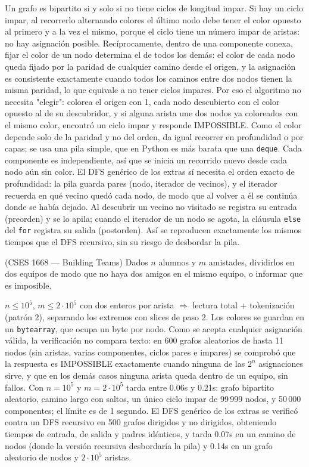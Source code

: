  Un grafo es bipartito si y solo si no tiene ciclos de longitud impar. Si hay un ciclo impar, al recorrerlo alternando colores el último nodo debe tener el color opuesto al primero y a la vez el mismo, porque el ciclo tiene un número impar de aristas: no hay asignación posible. Recíprocamente, dentro de una componente conexa, fijar el color de un nodo determina el de todos los demás: el color de cada nodo queda fijado por la paridad de cualquier camino desde el origen, y la asignación es consistente exactamente cuando todos los caminos entre dos nodos tienen la misma paridad, lo que equivale a no tener ciclos impares. Por eso el algoritmo no necesita "elegir": colorea el origen con 1, cada nodo descubierto con el color opuesto al de su descubridor, y si alguna arista une dos nodos ya coloreados con el mismo color, encontró un ciclo impar y responde IMPOSSIBLE. Como el color depende solo de la paridad y no del orden, da igual recorrer en profundidad o por capas; se usa una pila simple, que en Python es más barata que una \texttt{deque}. Cada componente es independiente, así que se inicia un recorrido nuevo desde cada nodo aún sin color. El DFS genérico de los extras sí necesita el orden exacto de profundidad: la pila guarda pares (nodo, iterador de vecinos), y el iterador recuerda en qué vecino quedó cada nodo, de modo que al volver a él se continúa donde se había dejado. Al descubrir un vecino no visitado se registra su entrada (preorden) y se lo apila; cuando el iterador de un nodo se agota, la cláusula \texttt{else} del \texttt{for} registra su salida (postorden). Así se reproducen exactamente los mismos tiempos que el DFS recursivo, sin su riesgo de desbordar la pila.


(CSES 1668 — Building Teams) Dados $n$ alumnos y $m$ amistades, dividirlos en dos equipos de modo que no haya dos amigos en el mismo equipo, o informar que es imposible.

 $n \le 10^5$, $m \le 2\cdot10^5$ con dos enteros por arista $\Rightarrow$ lectura total + tokenización (patrón 2), separando los extremos con slices de paso 2. Los colores se guardan en un \texttt{bytearray}, que ocupa un byte por nodo. Como se acepta cualquier asignación válida, la verificación no compara texto: en 600 grafos aleatorios de hasta 11 nodos (sin aristas, varias componentes, ciclos pares e impares) se comprobó que la respuesta es IMPOSSIBLE exactamente cuando ninguna de las $2^n$ asignaciones sirve, y que en los demás casos ninguna arista queda dentro de un equipo, sin fallos. Con $n = 10^5$ y $m = 2\cdot10^5$ tarda entre \aprox{}0.06s y \aprox{}0.21s: grafo bipartito aleatorio, camino largo con saltos, un único ciclo impar de 99\,999 nodos, y 50\,000 componentes; el límite es de 1 segundo. El DFS genérico de los extras se verificó contra un DFS recursivo en 500 grafos dirigidos y no dirigidos, obteniendo tiempos de entrada, de salida y padres idénticos, y tarda \aprox{}0.07s en un camino de  nodos (donde la versión recursiva desbordaría la pila) y \aprox{}0.14s en un grafo aleatorio de  nodos y $2\cdot10^5$ aristas.

